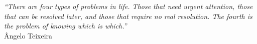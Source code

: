\cleardoublepage
\thispagestyle{plain}

\vspace*{8cm}

\begin{flushright}
  \textsl{``There are four types of problems in life. Those that need urgent attention, those that can be resolved later, and those that require no real resolution. The fourth is the problem of knowing which is which.''}\\
\vspace*{1.5cm}
    Ângelo Teixeira
\end{flushright}
